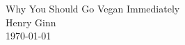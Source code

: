 \documentclass[hidelinks, 11 pt]{article}
\begin{document}
\addtolength{\topmargin}{-1.6pt}
\thispagestyle{firstpage}

\begin{center}
    \vspace*{-20mm}
    \huge Why You Should Go Vegan Immediately  \\
    \vspace{5mm}
    \large Henry Ginn  \\
    \vspace{3 mm}
    \large \today
\end{center}
\vspace{5mm}






\end{document}
